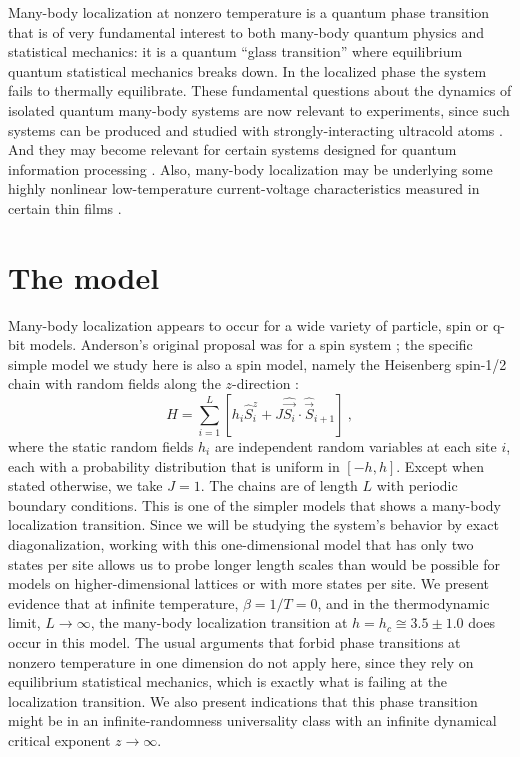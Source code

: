 \documentclass[letterpaper, twocolumn,superscriptaddress, showpacs,preprintnumbers,amsmath,amssymb]{revtex4}
\begin{document}
Many-body localization at nonzero temperature is a quantum phase transition that is of very
fundamental interest to both many-body quantum physics and
statistical mechanics:
it is a quantum ``glass transition'' where equilibrium quantum statistical mechanics breaks down.
In the localized phase the system fails to thermally equilibrate.
These fundamental questions about the dynamics of isolated quantum many-body systems are now relevant
to experiments, since such systems can be produced and studied with strongly-interacting ultracold atoms \cite{bdz}.
And they may become relevant for certain systems designed for quantum information processing \cite{sap}.
Also, many-body localization may be underlying some highly nonlinear low-temperature current-voltage
characteristics measured in certain thin films \cite{akla}.

\section{The model}

Many-body localization appears to occur for a wide variety of particle, spin or q-bit models.
Anderson's original proposal was for a spin system \cite{pwa58};
the specific simple model we study here is also a spin model,
namely the Heisenberg spin-1/2 chain with random fields along the $z$-direction \cite{zpp}:
\begin{equation}
H = \sum_{i=1}^L [h_i \hat{S}_i^{z} + J\hat{\vec{S_i}} \cdot \hat{\vec{S}}_{i+1}]~,
\end{equation}
where the static random fields $h_i$ are independent random variables at each site $i$, %
each with a probability distribution that is uniform in $[-h, h]$.
Except when stated otherwise, we take $J=1$.  The chains are of length $L$ with periodic boundary conditions.
This is one of the simpler models that shows a many-body localization transition.  Since we will be studying the system's behavior by exact diagonalization,
working with this one-dimensional model that has only two states per site %
allows us to probe longer length scales than would be possible for models on higher-dimensional lattices or with more states per site.
We present evidence that at infinite temperature, $\beta=1/T=0$, and in the thermodynamic limit, $L\rightarrow\infty$,
the many-body localization transition at $h=h_c\cong 3.5 \pm 1.0$ does occur in this model.
The usual arguments that forbid phase transitions at nonzero temperature in one dimension do not apply here,
since they rely on equilibrium statistical mechanics, which is exactly what is failing at the localization transition.
We also present indications that this phase transition might be in an infinite-randomness universality class
with an infinite dynamical critical exponent $z\rightarrow\infty$.
\end{document}
